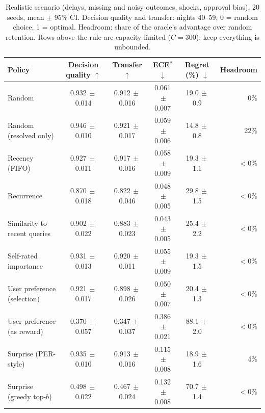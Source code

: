 \begin{table}[t]
\centering\small
\caption{Realistic scenario (delays, missing and noisy outcomes, shocks, approval bias), 20 seeds, mean $\pm$ 95\% CI. Decision quality and transfer: nights 40--59, 0 = random choice, 1 = optimal. Headroom: share of the oracle's advantage over random retention. Rows above the rule are capacity-limited ($C=300$); keep everything is unbounded.}
\label{tab:main}
\begin{tabular}{@{}lccccr@{}}
\toprule
Policy & Decision quality $\uparrow$ & Transfer $\uparrow$ & ECE$^\ast$ $\downarrow$ & Regret (\%) $\downarrow$ & Headroom\\
\midrule
Random & 0.932{\scriptsize$\,\pm$0.014} & 0.912{\scriptsize$\,\pm$0.016} & 0.061{\scriptsize$\,\pm$0.007} & 19.0{\scriptsize$\,\pm$0.9} & 0\%\\
Random (resolved only) & 0.946{\scriptsize$\,\pm$0.010} & 0.921{\scriptsize$\,\pm$0.017} & 0.059{\scriptsize$\,\pm$0.006} & 14.8{\scriptsize$\,\pm$0.8} & 22\%\\
Recency (FIFO) & 0.927{\scriptsize$\,\pm$0.011} & 0.917{\scriptsize$\,\pm$0.016} & 0.058{\scriptsize$\,\pm$0.009} & 19.3{\scriptsize$\,\pm$1.1} & $<$0\%\\
Recurrence & 0.870{\scriptsize$\,\pm$0.018} & 0.822{\scriptsize$\,\pm$0.046} & 0.048{\scriptsize$\,\pm$0.005} & 29.8{\scriptsize$\,\pm$1.5} & $<$0\%\\
Similarity to recent queries & 0.902{\scriptsize$\,\pm$0.022} & 0.883{\scriptsize$\,\pm$0.023} & 0.043{\scriptsize$\,\pm$0.005} & 25.4{\scriptsize$\,\pm$2.2} & $<$0\%\\
Self-rated importance & 0.931{\scriptsize$\,\pm$0.013} & 0.920{\scriptsize$\,\pm$0.011} & 0.055{\scriptsize$\,\pm$0.009} & 19.3{\scriptsize$\,\pm$1.5} & $<$0\%\\
User preference (selection) & 0.921{\scriptsize$\,\pm$0.017} & 0.898{\scriptsize$\,\pm$0.026} & 0.050{\scriptsize$\,\pm$0.007} & 20.4{\scriptsize$\,\pm$1.3} & $<$0\%\\
User preference (as reward) & 0.370{\scriptsize$\,\pm$0.057} & 0.347{\scriptsize$\,\pm$0.037} & 0.386{\scriptsize$\,\pm$0.021} & 88.1{\scriptsize$\,\pm$2.0} & $<$0\%\\
Surprise (PER-style) & 0.935{\scriptsize$\,\pm$0.010} & 0.913{\scriptsize$\,\pm$0.016} & 0.115{\scriptsize$\,\pm$0.008} & 18.9{\scriptsize$\,\pm$1.6} & 4\%\\
Surprise (greedy top-$b$) & 0.498{\scriptsize$\,\pm$0.022} & 0.467{\scriptsize$\,\pm$0.024} & 0.132{\scriptsize$\,\pm$0.008} & 70.7{\scriptsize$\,\pm$1.4} & $<$0\%\\

\end{tabular}
\end{table}
